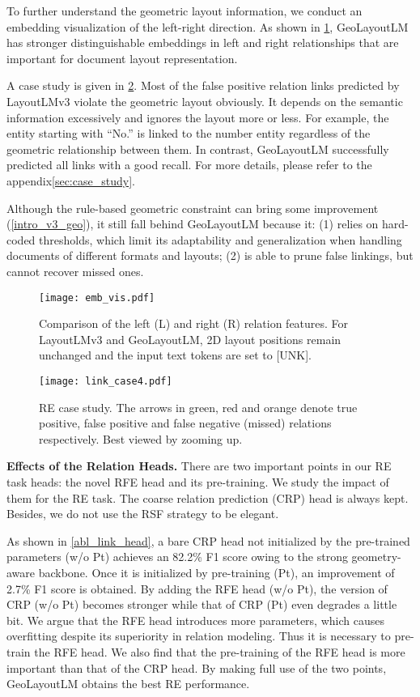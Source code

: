 \documentclass[10pt,twocolumn,letterpaper]{article}
\begin{document}
To further understand the geometric layout information, we conduct an embedding visualization of the left-right direction. As shown in \cref{fig:vis_emb_intro}, GeoLayoutLM has stronger distinguishable embeddings in left and right relationships that are important for document layout representation.

A case study is given in \cref{link_case}. Most of the false positive relation links predicted by LayoutLMv3 violate the geometric layout obviously. It depends on the semantic information excessively and ignores the layout more or less. For example, the entity starting with ``No.'' is linked to the number entity regardless of the geometric relationship between them. In contrast, GeoLayoutLM successfully predicted all links with a good recall. For more details, please refer to the appendix\ref{sec:case_study}.

Although the rule-based geometric constraint can bring some improvement (\cref{intro_v3_geo}), it still fall behind GeoLayoutLM because it:
(1) relies on hard-coded thresholds, which limit its adaptability and generalization when handling documents of different formats and layouts; (2) is able to prune false linkings, but cannot recover missed ones.

\begin{figure}[tp]
  \texttt{[image: emb\_vis.pdf]}
  \caption{Comparison of the left (L) and right (R) relation features. For LayoutLMv3 and GeoLayoutLM, 2D layout positions remain unchanged and the input text tokens are set to [UNK].}
  \label{fig:vis_emb_intro}
  \vspace{-4mm}
\end{figure}

\begin{figure}[t]
  \centering
   \texttt{[image: link\_case4.pdf]}
   \vspace{-2mm}
   \caption{RE case study. The arrows in green, red and orange denote true positive, false positive and false negative (missed) relations respectively. Best viewed by zooming up.}
   \label{link_case}
\end{figure}

\noindent \textbf{Effects of the Relation Heads.}
There are two important points in our RE task heads: the novel RFE head and its pre-training. We study the impact of them for the RE task. The coarse relation prediction (CRP) head is always kept. Besides, we do not use the RSF strategy to be elegant.

As shown in \cref{abl_link_head}, a bare CRP head not initialized by the pre-trained parameters (w/o Pt) achieves an 82.2\% F1 score owing to the strong geometry-aware backbone. Once it is initialized by pre-training (Pt), an improvement of 2.7\% F1 score is obtained. By adding the RFE head (w/o Pt), the version of CRP (w/o Pt) becomes stronger while that of CRP (Pt) even degrades a little bit. We argue that the RFE head introduces more parameters, which causes overfitting despite its superiority in relation modeling. Thus it is necessary to pre-train the RFE head. We also find that the pre-training of the RFE head is more important than that of the CRP head. By making full use of the two points, GeoLayoutLM obtains the best RE performance.
\end{document}

